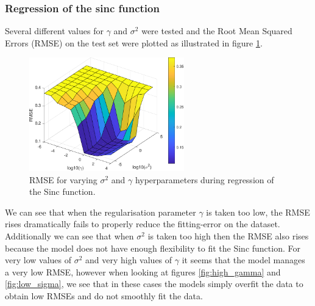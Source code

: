 \documentclass{article}
\begin{document}
        \subsubsection{Regression of the sinc function}
            Several different values for $\gamma$ and $\sigma^2$ were tested and the Root Mean Squared Errors (RMSE) on the test set were plotted as illustrated in figure \ref{fig:gauss_rbf_tuned}. 
            \begin{figure}[h]
                 \centering
                 \includegraphics[width=0.6\textwidth]{Assignment 2/figures/1_2/hyper_tuning_results.pdf}
                 
                \caption{RMSE for varying $\sigma^2$ and $\gamma$ hyperparameters during regression of the Sinc function.}
                \label{fig:gauss_rbf_tuned}
            \end{figure}
            
            We can see that when the regularisation parameter $\gamma$ is taken too low, the RMSE rises dramatically fails to  properly reduce the fitting-error on the dataset. Additionally we can see that when $\sigma^2$ is taken too high then the RMSE also rises because the model does not have enough flexibility to fit the Sinc function. For very low values of $\sigma^2$ and very high values of $\gamma$ it seems that the model manages a very low RMSE, however when looking at figures \ref{fig:high_gamma} and \ref{fig:low_sigma}, we see that in these cases the models simply overfit the data to obtain low RMSEs and do not smoothly fit the data.  
            
\end{document}
